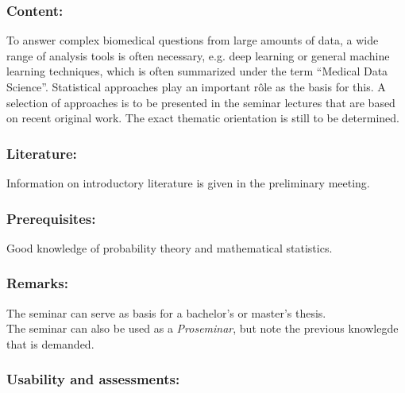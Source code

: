 \documentclass[a4paper,10pt]{article}
\begin{document}
\subsubsection*{\large
    Content:
}
To answer complex biomedical questions from large amounts of data, a wide range of analysis tools is often necessary, e.g. deep learning or general machine learning techniques, which is often summarized under the term ``Medical Data Science''. Statistical approaches play an important rôle as the basis for this. A selection of approaches is to be presented in the seminar lectures that are based on recent original work. The exact thematic orientation is still to be determined.
\subsubsection*{\large
    Literature:
}
Information on introductory literature is given in the preliminary meeting.
\subsubsection*{\large
    Prerequisites:
}
Good knowledge of probability theory and mathematical statistics.
\subsubsection*{\large
    Remarks:
}
The seminar can serve as basis for a bachelor's or master's thesis. \\
The seminar can also be used as a \emph{Proseminar}, but note the previous knowlegde that is demanded.
\subsubsection*{\large
    Usability and assessments:
}
\end{document}
